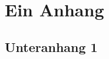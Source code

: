 \documentclass[%
english, ngerman,%
twoside, %
toc=bib,
BCOR=6mm, %
]{isw_smb_diss} %
\numberwithin{equation}{chapter} %
\begin{document}

\makeatletter
\renewcommand{\@seccntformat}[1]{Anhang \csname the#1\endcsname\quad} %
\makeatother

\section{Ein Anhang}
\subsection{Unteranhang 1}
\end{document}
